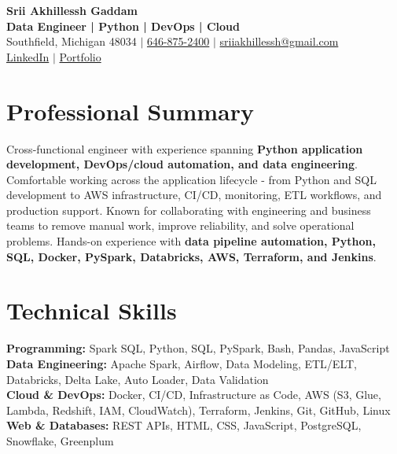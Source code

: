 \documentclass[letterpaper,10pt]{article}
\begin{document}
\fontsize{9.35pt}{10.45pt}\selectfont

\begin{center}
    {\LARGE \textbf{Srii Akhillessh Gaddam}} \\[-1pt]
    \textbf{Data Engineer | Python | DevOps | Cloud} \\[2pt]
    Southfield, Michigan 48034 $|$
    \href{tel:6468752400}{646-875-2400} $|$
    \href{mailto:sriiakhillessh@gmail.com}{sriiakhillessh@gmail.com} \\[1pt]
    \href{https://www.linkedin.com/in/srii-akhiilessh-gaddam-b48668191/}{LinkedIn} $|$
    \href{https://sriiakhillesshg.github.io/portfolio/}{Portfolio}
\end{center}
\vspace{-8pt}

\section{Professional Summary}
\small{Cross-functional engineer with experience spanning \textbf{Python application development, DevOps/cloud automation, and data engineering}. Comfortable working across the application lifecycle - from Python and SQL development to AWS infrastructure, CI/CD, monitoring, ETL workflows, and production support. Known for collaborating with engineering and business teams to remove manual work, improve reliability, and solve operational problems. Hands-on experience with \textbf{data pipeline automation, Python, SQL, Docker, PySpark, Databricks, AWS, Terraform, and Jenkins}.}

\section{Technical Skills}
\small{
\textbf{Programming:} Spark SQL, Python, SQL, PySpark, Bash, Pandas, JavaScript \\
\textbf{Data Engineering:} Apache Spark, Airflow, Data Modeling, ETL/ELT, Databricks, Delta Lake, Auto Loader, Data Validation \\
\textbf{Cloud \& DevOps:} Docker, CI/CD, Infrastructure as Code, AWS (S3, Glue, Lambda, Redshift, IAM, CloudWatch), Terraform, Jenkins, Git, GitHub, Linux \\
\textbf{Web \& Databases:} REST APIs, HTML, CSS, JavaScript, PostgreSQL, Snowflake, Greenplum
}
\end{document}
